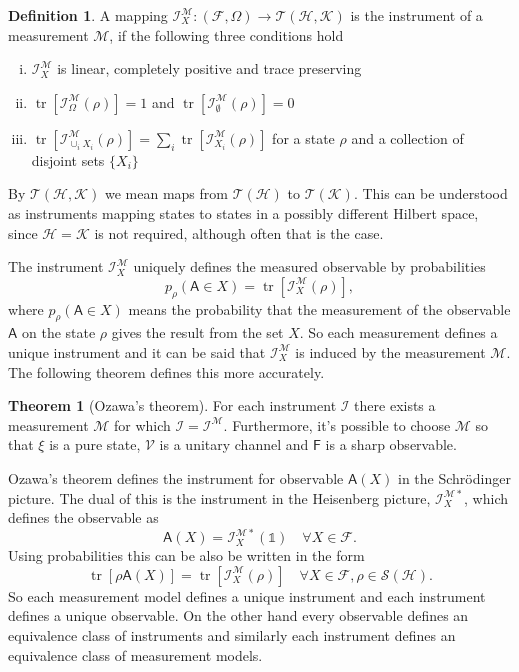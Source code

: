 \documentclass[a4paper,12pt]{wihuri}
\theoremstyle{definition}
\newtheorem{definition}{Definition}
\newtheorem{theorem}{Theorem}
\numberwithin{definition}{section}
\numberwithin{example}{section}
\numberwithin{theorem}{section}
\numberwithin{proposition}{section}
\numberwithin{lemma}{section}
\newcommand{\I}{\mathcal{I}}%
\newcommand{\ins}{\I_X^{\mm}}%
\newcommand{\insd}{\I_X^{\mm *}}%
\newcommand{\hi}{\mathcal{H}}%
\newcommand{\ki}{\mathcal{K}}%
\newcommand{\salg}{\mathcal{F}}%
\newcommand{\tc}{\mathcal{T}}%
\newcommand{\tila}{\mathcal{S}}%
\newcommand{\mm}{\mathcal{M}}%
\newcommand{\V}{\mathcal{V}}%
\newcommand{\A}{\mathsf{A}}%
\newcommand{\F}{\mathsf{F}}%
\newcommand{\id}{\mathds{1}}
\DeclareMathOperator{\tr}{tr}
\begin{document}
\begin{definition}
A mapping $\ins :(\salg, \Omega) \rightarrow \tc(\hi, \ki)$ is the instrument of a measurement $\mm$, if the following three conditions hold
\begin{enumerate}[i)]
\item $\ins$ is linear, completely positive and trace preserving
\item $\tr[\I_{\Omega}^{\mm}(\rho)] = 1$ and $\tr[\I_{\emptyset}^{\mm}(\rho)] = 0$
\item $\tr[\I_{\cup_iX_i}^{\mm}(\rho)] = \sum_i\tr[\I_{X_i}^{\mm}(\rho)]$ for a state $\rho$ and a collection of disjoint sets $\lbrace X_i \rbrace$
\end{enumerate}
By $\tc(\hi,\ki)$ we mean maps from $\tc(\hi)$ to $\tc(\ki)$. This can be understood as instruments mapping states to states in a possibly different Hilbert space, since $\hi = \ki$ is not required, although often that is the case.
\end{definition}
The instrument $\ins$ uniquely defines the measured observable by probabilities
\begin{equation*}
p_{\rho}(\A \in X) = \tr[\ins(\rho)],
\end{equation*}
where $p_{\rho}(\A \in X)$ means the probability that the measurement of the observable $\A$ on the state $\rho$ gives the result from the set $X$. So each measurement defines a unique instrument and it can be said that $\ins$ is induced by the measurement $\mm$. The following theorem defines this more accurately.

\begin{theorem}[Ozawa's theorem]
For each instrument $\I$ there exists a measurement $\mm$ for which $\I = \I^{\mm}$. Furthermore, it's possible to choose $\mm$ so that $\xi$ is a pure state, $\V$ is a unitary channel and $\F$ is a sharp observable\cite{Ozawa}.
\end{theorem}

Ozawa's theorem defines the instrument for observable $\A(X)$  in the Schrödinger picture. The dual of this is the instrument in the Heisenberg picture, $\insd$, which defines the observable as 
\begin{equation*}
\A(X) = \insd (\id) \quad \forall X \in \salg \mathrm{.}
\end{equation*}
Using probabilities this can be also be written in the form
\begin{equation*}
\tr[\rho \A(X)] = \tr[\ins (\rho)] \quad \forall X \in \salg , \rho \in \tila (\hi) \mathrm{.}
\end{equation*}
So each measurement model defines a unique instrument and each instrument defines a unique observable. On the other hand every observable defines an equivalence class of instruments and similarly each instrument defines an equivalence class of measurement models.
\end{document}
